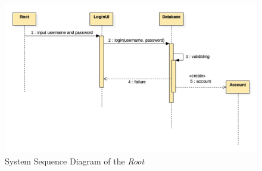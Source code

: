 \documentclass{article}
\begin{document}
\begin{figure}[ht!]
\centering
\includegraphics[width=128mm]{SequanceDiagram_Root.jpg}
\caption{System Sequence Diagram of the \textit{Root}}
\end{figure}
\end{document}
